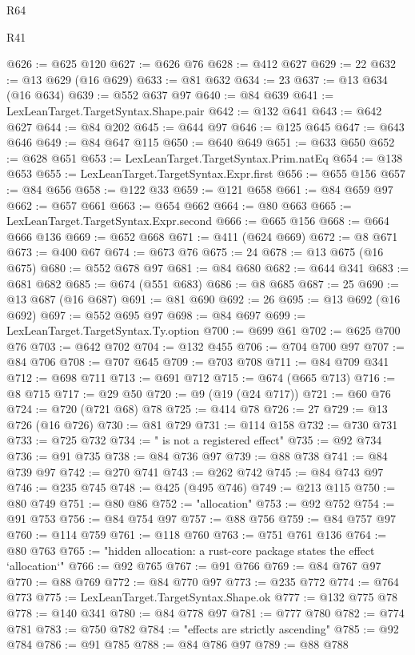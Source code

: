 \begin{lexlean}{R64}
\begin{lexlean}{R41}
\begin{coremodule}
{{{{{{{{{{{{{{{{{{{{{{{{{{{{{{{{{{{{{{{{{{{{{{{{{{{{{{{{{{{{{{{{{{{{{{{{{{{{{{{{{{{{{{{{{@626 := @625 @120
@627 := @626 @76
@628 := @412 @627
@629 := 22
@632 := @13 @629 (@16 @629)
@633 := @81 @632
@634 := 23
@637 := @13 @634 (@16 @634)
@639 := @552 @637 @97
@640 := @84 @639
@641 := LexLeanTarget.TargetSyntax.Shape.pair
@642 := @132 @641
@643 := @642 @627
@644 := @84 @202
@645 := @644 @97
@646 := @125 @645
@647 := @643 @646
@649 := @84 @647 @115
@650 := @640 @649
@651 := @633 @650
@652 := @628 @651
@653 := LexLeanTarget.TargetSyntax.Prim.natEq
@654 := @138 @653
@655 := LexLeanTarget.TargetSyntax.Expr.first
@656 := @655 @156
@657 := @84 @656
@658 := @122 @33
@659 := @121 @658
@661 := @84 @659 @97
@662 := @657 @661
@663 := @654 @662
@664 := @80 @663
@665 := LexLeanTarget.TargetSyntax.Expr.second
@666 := @665 @156
@668 := @664 @666 @136
@669 := @652 @668
@671 := @411 (@624 @669)
@672 := @8 @671
@673 := @400 @67
@674 := @673 @76
@675 := 24
@678 := @13 @675 (@16 @675)
@680 := @552 @678 @97
@681 := @84 @680
@682 := @644 @341
@683 := @681 @682
@685 := @674 (@551 @683)
@686 := @8 @685
@687 := 25
@690 := @13 @687 (@16 @687)
@691 := @81 @690
@692 := 26
@695 := @13 @692 (@16 @692)
@697 := @552 @695 @97
@698 := @84 @697
@699 := LexLeanTarget.TargetSyntax.Ty.option
@700 := @699 @61
@702 := @625 @700 @76
@703 := @642 @702
@704 := @132 @455
@706 := @704 @700 @97
@707 := @84 @706
@708 := @707 @645
@709 := @703 @708
@711 := @84 @709 @341
@712 := @698 @711
@713 := @691 @712
@715 := @674 (@665 @713)
@716 := @8 @715
@717 := @29 @50
@720 := @9 (@19 (@24 @717))
@721 := @60 @76
@724 := @720 (@721 @68) @78
@725 := @414 @78
@726 := 27
@729 := @13 @726 (@16 @726)
@730 := @81 @729
@731 := @114 @158
@732 := @730 @731
@733 := @725 @732
@734 := " is not a registered effect"
@735 := @92 @734
@736 := @91 @735
@738 := @84 @736 @97
@739 := @88 @738
@741 := @84 @739 @97
@742 := @270 @741
@743 := @262 @742
@745 := @84 @743 @97
@746 := @235 @745
@748 := @425 (@495 @746)
@749 := @213 @115
@750 := @80 @749
@751 := @80 @86
@752 := "allocation"
@753 := @92 @752
@754 := @91 @753
@756 := @84 @754 @97
@757 := @88 @756
@759 := @84 @757 @97
@760 := @114 @759
@761 := @118 @760
@763 := @751 @761 @136
@764 := @80 @763
@765 := "hidden allocation: a rust-core package states the effect `allocation`"
@766 := @92 @765
@767 := @91 @766
@769 := @84 @767 @97
@770 := @88 @769
@772 := @84 @770 @97
@773 := @235 @772
@774 := @764 @773
@775 := LexLeanTarget.TargetSyntax.Shape.ok
@777 := @132 @775 @78
@778 := @140 @341
@780 := @84 @778 @97
@781 := @777 @780
@782 := @774 @781
@783 := @750 @782
@784 := "effects are strictly ascending"
@785 := @92 @784
@786 := @91 @785
@788 := @84 @786 @97
@789 := @88 @788
}}}}}}}}}}}}}}}}}}}}}}}}}}}}}}}}}}}}}}}}}}}}}}}}}}}}}}}}}}}}}}}}}}}}}}}}}}}}}}}}}}}}}}}}}
\end{coremodule}
\end{lexlean}
\end{lexlean}

